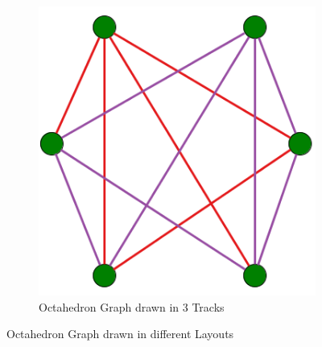 \documentclass[bachelor, english]{algothesis}
\begin{document}
\begin{figure}[ht]
    \begin{subfigure}[b]{0.45\linewidth}
        \centering
        \includegraphics[width=0.8\linewidth]{figures/octahedron_tlp.png}
        \caption{Octahedron Graph drawn in 3 Tracks}
        \label{fig:octahedron_tlp}
    \end{subfigure}

    \caption{Octahedron Graph drawn in different Layouts \protect\footnotemark}
    \label{fig:octahedron_layouts}
\end{figure}


\clearpage
\end{document}
